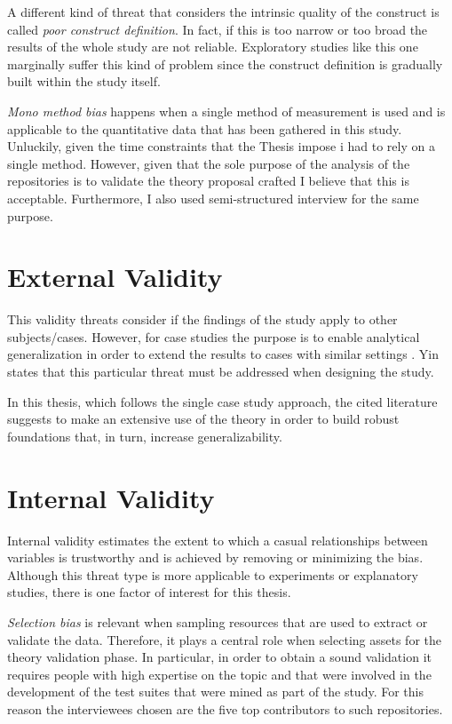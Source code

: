     A different kind of threat that considers the intrinsic quality of the construct is called \textit{poor construct definition}. In fact, if this is too narrow or too broad the results of the whole study are not reliable. Exploratory studies like this one marginally suffer this kind of problem since the construct definition is gradually built within the study itself.

    \textit{Mono method bias} happens when a single method of measurement is used and is applicable to the quantitative data that has been gathered in this study. Unluckily, given the time constraints that the Thesis impose i had to rely on a single method. However, given that the sole purpose of the analysis of the repositories is to validate the theory proposal crafted I believe that this is acceptable. Furthermore, I also used semi-structured interview for the same purpose.

\section{External Validity}
This validity threats consider if the findings of the study apply to other subjects/cases. However, for case studies the purpose is to enable analytical generalization in order to extend the results to cases with similar settings \cite{case_study_software_engineering}. Yin \cite{case_study_guide} states that this particular threat must be addressed when designing the study.

In this thesis, which follows the single case study approach, the cited literature suggests to make an extensive use of the theory in order to build robust foundations that, in turn, increase generalizability.


\section{Internal Validity}
Internal validity estimates the extent to which a casual relationships between variables is trustworthy and is achieved by removing or minimizing the bias. Although this threat type is more applicable to experiments or explanatory studies, there is one factor of interest for this thesis.

\textit{Selection bias} is relevant when sampling resources that are used to extract or validate the data. Therefore, it plays a central role when selecting assets for the theory validation phase. In particular, in order to obtain a sound validation it requires people with high expertise on the topic and that were involved in the development of the test suites that were mined as part of the study. For this reason the interviewees chosen are the five top contributors to such repositories.


